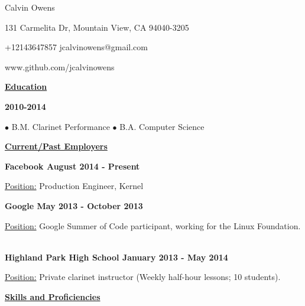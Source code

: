 \documentclass[11pt]{article}
\begin{document}
\centerline{{\Huge \sc Calvin Owens}}
\centerline{131 Carmelita Dr, Mountain View, CA 94040-3205}
\centerline{+12143647857 \textbullet \hspace{1pt} jcalvinowens@gmail.com}
\centerline{www.github.com/jcalvinowens}

\noindent
\hrulefill

\centerline{\underline{\bf Education}}
\bigskip
{} \hfill {\bf 2010-2014} \\
\centerline{\hfill $\bullet$ B.M. Clarinet Performance \hfill $\bullet$ B.A. Computer Science \hfill}

\noindent
\hrulefill

\centerline{\underline{\bf Current/Past Employers}}
\bigskip
\noindent\centerline{\bf Facebook \hfill August 2014 - Present}
\underline{Position:} Production Engineer, Kernel
\vspace*{6pt}\\
\noindent\centerline{\bf Google \hfill May 2013 - October 2013}
\underline{Position:} Google Summer of Code participant, working for the Linux Foundation. \\
\vspace*{6pt}\\
\noindent\centerline{\bf Highland Park High School \hfill January 2013 - May 2014}
\underline{Position:} Private clarinet instructor (Weekly half-hour lessons; 10 students).

\noindent
\hrulefill

\centerline{\underline{\bf Skills and Proficiencies}}
\end{document}
